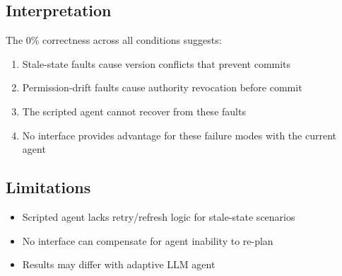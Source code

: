 \subsection{Interpretation}
The 0\% correctness across all conditions suggests:
\begin{enumerate}
    \item Stale-state faults cause version conflicts that prevent commits
    \item Permission-drift faults cause authority revocation before commit
    \item The scripted agent cannot recover from these faults
    \item No interface provides advantage for these failure modes with the current agent
\end{enumerate}

\subsection{Limitations}
\begin{itemize}
    \item Scripted agent lacks retry/refresh logic for stale-state scenarios
    \item No interface can compensate for agent inability to re-plan
    \item Results may differ with adaptive LLM agent
\end{itemize}

